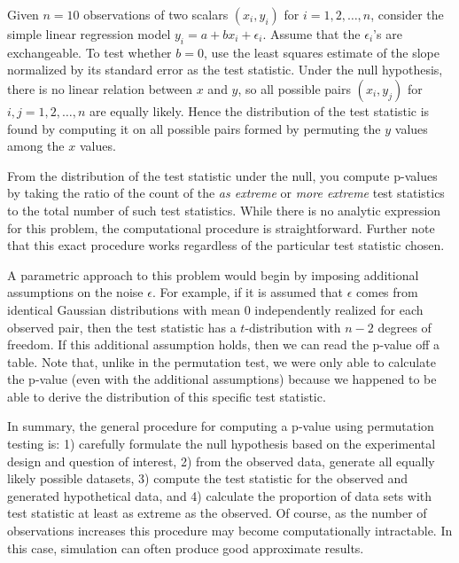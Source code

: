 \begin{example} Given $n=10$ observations of two scalars $(x_i, y_i)$ for
$i = 1, 2, \dots, n$, consider the simple linear regression model
$y_i = a + bx_i + \epsilon_i$.  Assume that the $\epsilon_i$'s are
exchangeable.  To test whether $b = 0$, use the least squares estimate of the slope
normalized by its standard error as the test statistic.  Under the null
hypothesis, there is no linear relation between $x$ and $y$, so all possible
pairs $(x_i,y_j)$ for $i, j = 1, 2, \dots, n$ are equally likely.  Hence the
distribution of the test statistic is found by computing it on all possible
pairs formed by permuting the $y$ values among the $x$ values.

From the distribution of the test statistic under the null, you compute
p-values by taking the ratio of the count of the \emph{as extreme} or
\emph{more extreme} test statistics to the total number of such test
statistics. While there is no analytic expression for this problem, the
computational procedure is straightforward.  Further note that this exact
procedure works regardless of the particular test statistic chosen.

A parametric approach to this problem would begin by imposing additional
assumptions on the noise $\epsilon$.  For example, if it is assumed that
$\epsilon$ comes from identical Gaussian distributions with mean 0
independently realized for each observed pair, then the test statistic has a
$t$-distribution with $n-2$ degrees of freedom.  If this additional assumption
holds, then we can read the p-value off a table.  Note that, unlike in the
permutation test, we were only able to calculate the p-value (even with the
additional assumptions) because we happened to be able to derive the
distribution of this specific test statistic.
\end{example}


In summary, the general procedure for computing a p-value using permutation
testing is: 1) carefully formulate the null hypothesis based on the
experimental design and question of interest, 2) from the observed data,
generate all equally likely possible datasets, 3) compute the test statistic
for the observed and generated hypothetical data, and 4) calculate the
proportion of data sets with test statistic at least as extreme as the
observed.  Of course, as the number of observations increases this procedure
may become computationally intractable.  In this case, simulation can often
produce good approximate results.

